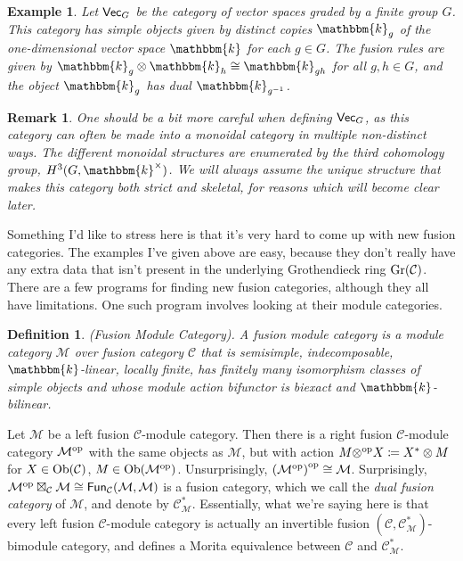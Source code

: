 \documentclass[12pt, reqno]{amsart}
\numberwithin{equation}{section}
\theoremstyle{plainspace}
\theoremstyle{definitionspace}
\newtheorem{definition}[theorem]{Definition}
\newtheorem{example}[theorem]{Example}
\theoremstyle{remarkspace}
\newtheorem{remark}[theorem]{Remark}
\newcommand{\mathcat}[1]{\mathcal{#1}}
\newcommand{\Ob}{\textup{Ob}}
\newcommand{\Fun}[2][]{
	\ifthenelse{\equal{#2}{}}
		{\textcat{Fun}_{#1}}
		{\textcat{Fun}_{#1}\!\left(#2\right)}
}
\newcommand{\opcat}[1]{{#1}^{\textup{op}}}
\newcommand{\textcat}[1]{\textup{\textsf{#1}}}
\newcommand{\Gr}{\textup{Gr}}
\begin{document}
\begin{example}\label{ex:fusion_category_graded_vect}
Let $\textcat{Vec}_G$ be the category of vector spaces graded by a finite group $G$. This category has simple objects given by distinct copies $\mathbbm{k}_g$ of the one-dimensional vector space $\mathbbm{k}$ for each $g \in G$. The fusion rules are given by $\mathbbm{k}_g \otimes \mathbbm{k}_h \cong \mathbbm{k}_{gh}$ for all $g, h \in G$, and the object $\mathbbm{k}_g$ has dual $\mathbbm{k}_{g^{-1}}$.
\end{example}
\leavevmode

\begin{remark}\label{rem:non-trivial_associativity}
One should be a bit more careful when defining $\textcat{Vec}_G$, as this category can often be made into a monoidal category in multiple non-distinct ways. The different monoidal structures are enumerated by the third cohomology group, $H^3(G, \mathbbm{k}^{\times})$. We will always assume the unique structure that makes this category both strict and skeletal, for reasons which will become clear later.
\end{remark}
\leavevmode

\noindent Something I'd like to stress here is that it's very hard to come up with new fusion categories. The examples I've given above are easy, because they don't really have any extra data that isn't present in the underlying Grothendieck ring $\Gr(\mathcat{C})$. There are a few programs for finding new fusion categories, although they all have limitations. One such program involves looking at their module categories.
\newline

\begin{definition}\label{def:fusion_module}{\em (Fusion Module Category).}
A {\em fusion module category} is a module category $\mathcat{M}$ over fusion category $\mathcat{C}$ that is semisimple, indecomposable, $\mathbbm{k}$-linear, locally finite, has finitely many isomorphism classes of simple objects and whose module action bifunctor is biexact and $\mathbbm{k}$-bilinear.
\end{definition}
\leavevmode

\noindent Let $\mathcat{M}$ be a left fusion $\mathcat{C}$-module category. Then there is a right fusion $\mathcat{C}$-module category $\opcat{\mathcat{M}}$ with the same objects as $\mathcat{M}$, but with action $M \opcat{\otimes} X \coloneqq X^{*} \otimes M$ for $X \in \Ob(\mathcat{C})$, $M \in \Ob(\opcat{\mathcat{M}})$. Unsurprisingly, $\opcat{(\opcat{\mathcat{M}})} \cong \mathcat{M}$. Surprisingly, $\opcat{\mathcat{M}} \boxtimes_{\mathcat{C}} \mathcat{M} \cong \Fun[\mathcat{C}]{\mathcat{M}, \mathcat{M}}$ is a fusion category, which we call the {\em dual fusion category} of $\mathcat{M}$, and denote by $\mathcat{C}_{\mathcat{M}}^{*}$. Essentially, what we're saying here is that every left fusion $\mathcat{C}$-module category is actually an invertible fusion $(\mathcat{C}, \mathcat{C}_{\mathcat{M}}^{*})$-bimodule category, and defines a Morita equivalence between $\mathcat{C}$ and $\mathcat{C}_{\mathcat{M}}^{*}$.
\newpage
\end{document}

